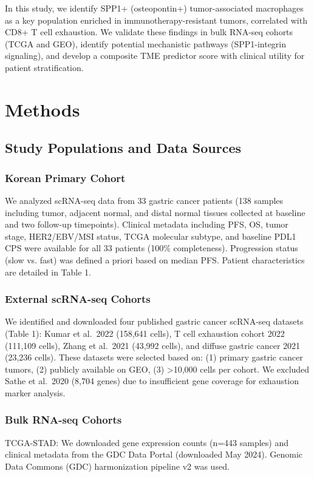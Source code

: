\documentclass[12pt,twoside]{article}
\begin{document}
In this study, we identify SPP1+ (osteopontin+) tumor-associated macrophages as a key population enriched in immunotherapy-resistant tumors, correlated with CD8+ T cell exhaustion. We validate these findings in bulk RNA-seq cohorts (TCGA and GEO), identify potential mechanistic pathways (SPP1-integrin signaling), and develop a composite TME predictor score with clinical utility for patient stratification.


\section{Methods}

\subsection{Study Populations and Data Sources}

\subsubsection{Korean Primary Cohort}
We analyzed scRNA-seq data from 33 gastric cancer patients (138 samples including tumor, adjacent normal, and distal normal tissues collected at baseline and two follow-up timepoints). Clinical metadata including PFS, OS, tumor stage, HER2/EBV/MSI status, TCGA molecular subtype, and baseline PDL1 CPS were available for all 33 patients (100\% completeness). Progression status (slow vs. fast) was defined a priori based on median PFS. Patient characteristics are detailed in Table 1.

\subsubsection{External scRNA-seq Cohorts}
We identified and downloaded four published gastric cancer scRNA-seq datasets (Table 1): Kumar et al.\ 2022 (158,641 cells), T cell exhaustion cohort 2022 (111,109 cells), Zhang et al.\ 2021 (43,992 cells), and diffuse gastric cancer 2021 (23,236 cells). These datasets were selected based on: (1) primary gastric cancer tumors, (2) publicly available on GEO, (3) >10,000 cells per cohort. We excluded Sathe et al.\ 2020 (8,704 genes) due to insufficient gene coverage for exhaustion marker analysis.

\subsubsection{Bulk RNA-seq Cohorts}
TCGA-STAD: We downloaded gene expression counts (n=443 samples) and clinical metadata from the GDC Data Portal (downloaded May 2024). Genomic Data Commons (GDC) harmonization pipeline v2 was used.
\end{document}

